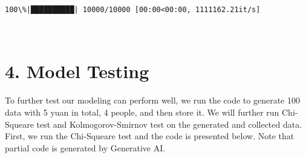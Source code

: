\documentclass[11pt]{article}
\begin{document}
    \begin{Verbatim}[commandchars=\\\{\}]
100\%|██████████| 10000/10000 [00:00<00:00, 1111162.21it/s]
    \end{Verbatim}

    \begin{center}
    \end{center}
    { \hspace*{\fill} \\}
    
    \section*{4. Model Testing}\label{model-testing}

To further test our modeling can perform well, we run the code to
generate 100 data with 5 yuan in total, 4 people, and then store it. We
will further run Chi-Squeare test and Kolmogorov-Smirnov test on the
generated and collected data. First, we run the Chi-Squeare test and the
code is presented below. Note that partial code is generated by
Generative AI.
\end{document}
